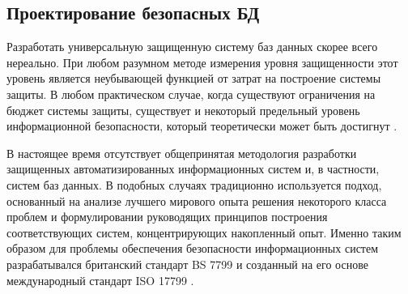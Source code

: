 \subsection{Проектирование безопасных БД}
Разработать универсальную защищенную систему баз данных скорее всего нереально. При любом
разумном методе измерения уровня защищенности этот уровень является неубывающей функцией
от затрат на построение системы защиты. В любом практическом случае, когда существуют
ограничения на бюджет системы защиты, существует и некоторый предельный уровень
информационной безопасности, который теоретически может быть достигнут  \autocite{security-policy_14}.

В настоящее время отсутствует общепринятая методология разработки защищенных
автоматизированных информационных систем и, в частности, систем баз данных. В подобных
случаях традиционно используется подход, основанный на анализе лучшего мирового опыта
решения некоторого класса проблем и формулировании руководящих принципов построения
соответствующих систем, концентрирующих накопленный опыт. Именно таким образом для проблемы
обеспечения безопасности информационных систем разрабатывался британский стандарт BS 7799
и созданный на его основе международный стандарт ISO 17799 \autocite{security-policy_14}.

